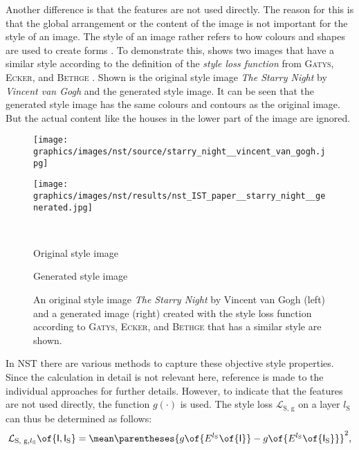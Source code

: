 Another difference is that the features are not used directly. The reason for this is that the global arrangement or the content of the image is not important for the style of an image. The style of an image rather refers to how colours and shapes are used to create forms \cite{Glas2021}. To demonstrate this,  shows two images that have a similar style according to the definition of the \emph{style loss function} from \textsc{Gatys}, \textsc{Ecker}, and \textsc{Bethge} \cite{GEB2016}. Shown is the original style image \emph{The Starry Night} by \emph{Vincent van Gogh} and the generated style image. It can be seen that the generated style image has the same colours and contours as the original image. But the actual content like the houses in the lower part of the image are ignored.
\begin{figure}
	\centering
	\begin{minipage}{.5\textwidth}
		\centering
		\texttt{[image: graphics/images/nst/source/starry\_night\_\_vincent\_van\_gogh.jpg]}
	\end{minipage}%
	\begin{minipage}{.5\textwidth}
		\centering
		\texttt{[image: graphics/images/nst/results/nst\_IST\_paper\_\_starry\_night\_\_generated.jpg]}
	\end{minipage}\\ \vspace{0.15cm}
	\begin{minipage}{.5\textwidth}
		\centering
		Original style image
	\end{minipage}%
	\begin{minipage}{.5\textwidth}
		\centering
		Generated style image
	\end{minipage}
	\caption{An original style image \emph{The Starry Night} by Vincent van Gogh (left) and a generated image (right) created with the style loss function according to \textsc{Gatys}, \textsc{Ecker}, and \textsc{Bethge}\cite{GEB2016} that has a similar style are shown.}
	\label{fig:generated_style_nst}
\end{figure} 
In \gls{NST} there are various methods to capture these objective style properties. Since the calculation in detail is not relevant here, reference is made to the individual approaches for further details\cite{GEB2016,LW2016}. However, to indicate that the features are not used directly, the function $g(\cdot)$ is used. The style loss $\mathcal{L}_\text{S, g}$ on a layer $l_\text{S}$ can thus be determined as follows:
\begin{equation*}
	\mathcal{L}_{\text{S, g}\eqcommasep l_\text{S}}\of{\tensor{I}\eqcommasep \tensor{I}_\text{S}} = \mean \parentheses{g\of{E^{l_\text{S}}\of{\tensor{I}}} - g\of{E^{l_\text{S}}\of{\tensor{I}_\text{S}}}}^2\eqtextcomma
\end{equation*}
